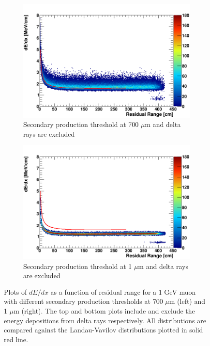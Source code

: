 \begin{figure}[tbp!]
\begin{subfigure}[b]{0.495\textwidth}
            \centering 
            \includegraphics[width=\textwidth]{derr_mu_only_700um}
            \caption{Secondary production threshold at 700 $\mu$m and delta rays are excluded}%
            \label{fig:derr_mu_only_700}
        \end{subfigure}
        \hfill
        \begin{subfigure}[b]{0.495\textwidth}   
            \centering 
            \includegraphics[width=\textwidth]{derr_mu_only_1um}
            \caption{Secondary production threshold at 1 $\mu$m and delta rays are excluded}%
            \label{fig:derr_mu_only_1}
        \end{subfigure}
        \caption{
	Plots of $dE/dx$ as a function of residual range for a 1 GeV muon with different secondary production thresholds at 700 $\mu$m (left) and 1 $\mu$m (right). 
	The top and bottom plots include and exclude the energy depositions from delta rays respectively. 
	All distributions are compared against the Landau-Vavilov distributions plotted in solid red line.
	}
        \label{fig:mu_derr}
\end{figure}

